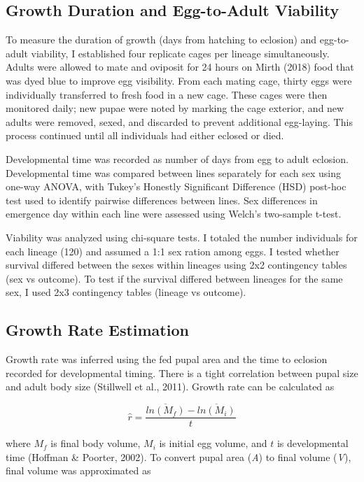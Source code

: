 \documentclass[12pt,reqno,oneside]{report}
\begin{document}
\subsection{Growth Duration and Egg-to-Adult Viability}

To measure the duration of growth (days from hatching to eclosion) and egg-to-adult viability, I established four replicate cages per lineage simultaneously. Adults were allowed to mate and oviposit for 24 hours on Mirth (2018) food that was dyed blue to improve egg visibility. From each mating cage, thirty eggs were individually transferred to fresh food in a new cage. These cages were then monitored daily; new pupae were noted by marking the cage exterior, and new adults were removed, sexed, and discarded to prevent additional egg-laying. This process continued until all individuals had either eclosed or died. 

Developmental time was recorded as number of days from egg to adult eclosion. Developmental time was compared between lines separately for each sex using one-way ANOVA, with Tukey's Honestly Significant Difference (HSD) post-hoc test used to identify pairwise differences between lines. Sex differences in emergence day within each line were assessed using Welch's two-sample t-test.

Viability was analyzed using chi-square tests. I totaled the number individuals for each lineage (120) and assumed a 1:1 sex ration among eggs. I tested whether survival differed between the sexes within lineages using 2x2 contingency tables (sex vs outcome). To test if the survival differed between lineages for the same sex, I used 2x3 contingency tables (lineage vs outcome).

\subsection{Growth Rate Estimation}

Growth rate was inferred using the fed pupal area and the time to eclosion recorded for developmental timing. There is a tight correlation between pupal size and adult body size (Stillwell et al., 2011). Growth rate can be calculated as 

\[\hat{r} = \frac{\overline{ln(M_f)} - \overline{ln(M_i)}}{t}\]

\noindent where \(M_f\) is final body volume, \(M_i\) is initial egg volume, and \(t\) is developmental time (Hoffman \& Poorter, 2002). To convert pupal area (\textit{A}) to final volume (\textit{V}), final volume was approximated as
\end{document}
